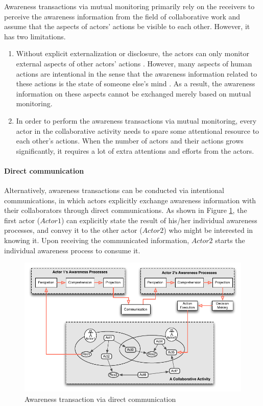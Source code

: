 Awareness transactions via mutual monitoring primarily rely on the receivers to perceive the awareness information from the field of collaborative work and assume that the aspects of actors' actions be visible to each other. However, it has two limitations. 
\begin{enumerate}
	\item Without explicit externalization or disclosure, the actors can only monitor external aspects of other actors' actions \cite{Rittenbruch2007}. However, many aspects of human actions are intentional in the sense that the awareness information related to these actions is the state of someone else's mind \cite{carroll2003a}. As a result, the awareness information on these aspects cannot be exchanged merely based on mutual monitoring.
	\item In order to perform the awareness transactions via mutual monitoring, every actor in the collaborative activity needs to spare some attentional resource to each other's actions. When the number of actors and their actions grows significantly, it requires a lot of extra attentions and efforts from the actors.
\end{enumerate}

\paragraph*{Direct communication} %
\label{par:communication}
Alternatively, awareness transactions can be conducted via intentional communications, in which actors explicitly exchange awareness information with their collaborators through direct communications. As shown in Figure \ref{fig:trans_communication}, the first actor ($Actor1$) can explicitly state the result of his/her individual awareness processes, and convey it to the other actor ($Actor2$) who might be interested in knowing it. Upon receiving the communicated information, $Actor2$ starts the individual awareness process to consume it. 

\begin{figure}[htbp] %
   \centering
   \includegraphics{trans_communication.pdf} 
   \caption{Awareness transaction via direct communication}
   \label{fig:trans_communication}
\end{figure}

